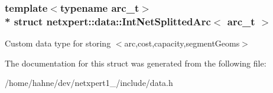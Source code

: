 \subsubsection*{template$<$typename arc\+\_\+t$>$\\*
struct netxpert\+::data\+::\+Int\+Net\+Splitted\+Arc$<$ arc\+\_\+t $>$}

Custom data type for storing $<$arc,cost,capacity,segment\+Geoms$>$ 

The documentation for this struct was generated from the following file\+:\begin{DoxyCompactItemize}
\item 
/home/hahne/dev/netxpert1\+\_/include/data.\+h\end{DoxyCompactItemize}
